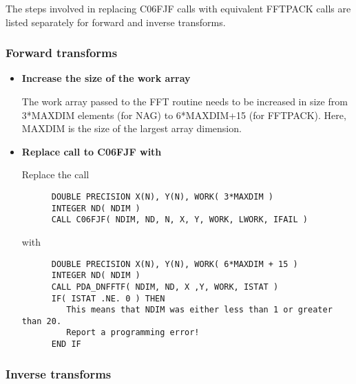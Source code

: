    The steps involved in replacing C06FJF calls with
   equivalent FFTPACK calls are listed separately for forward and
   inverse transforms.


\subsubsection{Forward transforms}

\begin{itemize}

\item{\bf Increase the size of the work array}

   The work array passed to the FFT routine needs to be increased in
   size from 3*MAXDIM elements (for NAG) to 6*MAXDIM+15 (for FFTPACK).
   Here, MAXDIM is the size of the largest array dimension.

\item{\bf Replace call to C06FJF with
}

   Replace the call

\begin{verbatim}
      DOUBLE PRECISION X(N), Y(N), WORK( 3*MAXDIM )
      INTEGER ND( NDIM )
      CALL C06FJF( NDIM, ND, N, X, Y, WORK, LWORK, IFAIL )
\end{verbatim}

   with

\begin{verbatim}
      DOUBLE PRECISION X(N), Y(N), WORK( 6*MAXDIM + 15 )
      INTEGER ND( NDIM )
      CALL PDA_DNFFTF( NDIM, ND, X ,Y, WORK, ISTAT )
      IF( ISTAT .NE. 0 ) THEN
         This means that NDIM was either less than 1 or greater than 20.
         Report a programming error!
      END IF
\end{verbatim}

\end{itemize}


\subsubsection{Inverse transforms}

